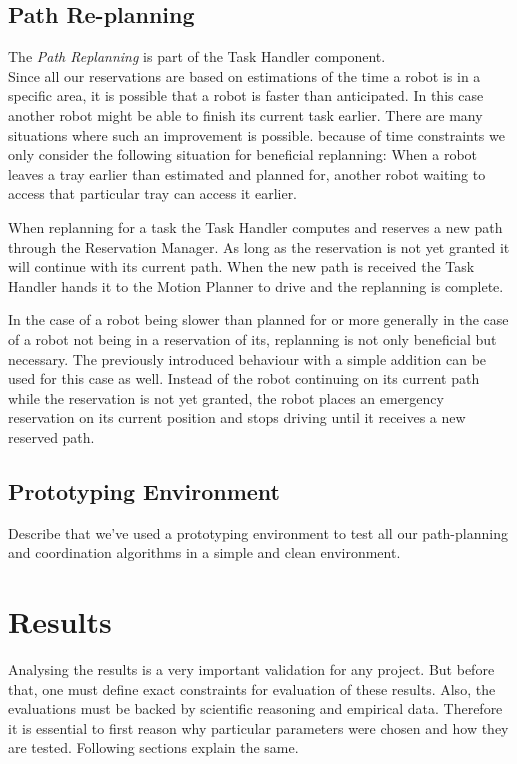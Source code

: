 \documentclass[journal]{IEEEtran}
\begin{document}
\subsection{Path Re-planning}
\label{subsec:path_replanning}
The \textit{Path Replanning} is part of the Task Handler component. \\
Since all our reservations are based on estimations of the time a robot is in a specific area, it is possible that a robot is faster than anticipated. In this case another robot might be able to finish its current task earlier.
There are many situations where such an improvement is possible. 
because of time constraints we only consider the following situation for beneficial replanning:
When a robot leaves a tray earlier than estimated and planned for, another robot waiting to access that particular tray can access it earlier.

When replanning for a task the Task Handler computes and reserves a new path through the Reservation Manager.
As long as the reservation is not yet granted it will continue with its current path.
When the new path is received the Task Handler hands it to the Motion Planner to drive and the replanning is complete.

In the case of a robot being slower than planned for or more generally in the case of a robot not being in a reservation of its, replanning is not only beneficial but necessary.
The previously introduced behaviour with a simple addition can be used for this case as well. Instead of the robot continuing on its current path while the reservation is not yet granted, the robot places an emergency reservation on its current position and stops driving until it receives a new reserved path.

\subsection{Prototyping Environment}
\label{subsec:prototyping_environment}
Describe that we've used a prototyping environment to test all our path-planning and coordination algorithms in a simple and clean environment.

\section{Results}
\label{sec:results}
Analysing the results is a very important validation for any project. But before that, one must define exact constraints for evaluation of these results. Also, the evaluations must be backed by scientific reasoning and empirical data. Therefore it is essential to first reason why particular parameters were chosen and how they are tested. Following sections explain the same.
\end{document}

